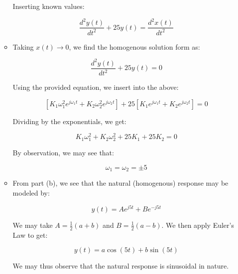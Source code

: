 \begin{enumerate}
\begin{itemize}
        Inserting known values:

        $$\boxed{\frac{d^2y(t)}{dt^2}+25y(t)=\frac{d^2x(t)}{dt^2}}$$

      \item 

        Taking $x(t)\to0$, we find the homogenous solution form as:

        $$\frac{d^2y(t)}{dt^2}+25y(t)=0$$

        Using the provided equation, we insert into the above:

        $$\left[ K_1\omega_1^2e^{j\omega_1 t}+K_2\omega_2^2e^{j\omega_2t} \right]+25\left[ K_1e^{j\omega_1 t}+K_2e^{j\omega_2t} \right]=0$$

        Dividing by the exponentials, we get:

        $$K_1\omega_1^2+K_2\omega_2^2+25K_1+25K_2=0$$

        By observation, we may see that:

        $$\boxed{\omega_1=\omega_2=\pm5}$$

      \item 

        From part (b), we see that the natural (homogenous) response may be modeled by:

        $$y(t)=Ae^{j5t}+Be^{-j5t}$$

        We may take $A=\frac{1}{2}(a+b)$ and $B=\frac{1}{2}(a-b)$. We then apply Euler's Law to get:

        $$\boxed{y(t)=a\cos(5t)+b\sin(5t)}$$

        We may thus observe that the natural response is sinusoidal in nature.

    \end{itemize}

\end{enumerate}



